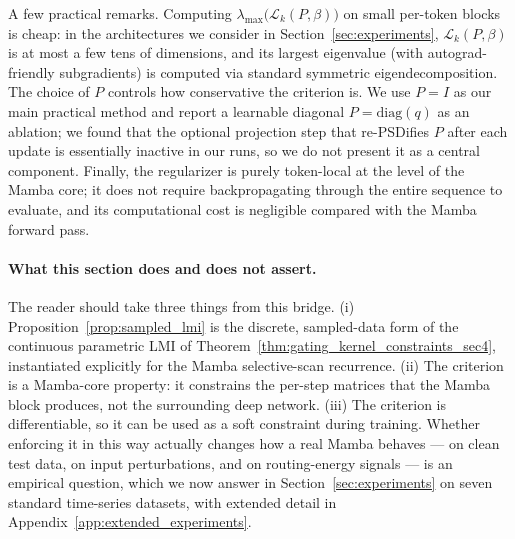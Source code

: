 \documentclass[10pt]{article} %
\theoremstyle{definition}
\begin{document}
A few practical remarks. Computing $\lambda_{\max}\bigl(\mathcal{L}_k(P,\beta)\bigr)$ on small per-token blocks is cheap: in the architectures we consider in Section~\ref{sec:experiments}, $\mathcal{L}_k(P,\beta)$ is at most a few tens of dimensions, and its largest eigenvalue (with autograd-friendly subgradients) is computed via standard symmetric eigendecomposition. The choice of $P$ controls how conservative the criterion is. We use $P=I$ as our main practical method and report a learnable diagonal $P=\mathrm{diag}(q)$ as an ablation; we found that the optional projection step that re-PSDifies $P$ after each update is essentially inactive in our runs, so we do not present it as a central component. Finally, the regularizer is purely token-local at the level of the Mamba core; it does not require backpropagating through the entire sequence to evaluate, and its computational cost is negligible compared with the Mamba forward pass.

\paragraph{What this section does and does not assert.} The reader should take three things from this bridge. (i) Proposition~\ref{prop:sampled_lmi} is the discrete, sampled-data form of the continuous parametric LMI of Theorem~\ref{thm:gating_kernel_constraints_sec4}, instantiated explicitly for the Mamba selective-scan recurrence. (ii) The criterion is a Mamba-core property: it constrains the per-step matrices that the Mamba block produces, not the surrounding deep network. (iii) The criterion is differentiable, so it can be used as a soft constraint during training. Whether enforcing it in this way actually changes how a real Mamba behaves --- on clean test data, on input perturbations, and on routing-energy signals --- is an empirical question, which we now answer in Section~\ref{sec:experiments} on seven standard time-series datasets, with extended detail in Appendix~\ref{app:extended_experiments}.
\end{document}
